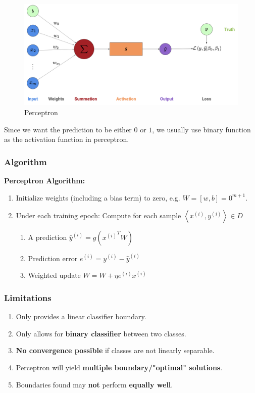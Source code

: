 \documentclass[11pt,a4paper]{article}
\begin{document}
\begin{center}\begin{figure}[htbp]
    \centering
    \includegraphics[scale=0.2]{per.png}
    \caption{Perceptron}
    \label{}
\end{figure}\end{center}

Since we want the prediction to be either $0$ or $1$, we usually use binary function as the activation function in perceptron.


\subsubsection{Algorithm}
\textbf{Perceptron Algorithm:}
\begin{enumerate}[$\bullet$]
    \item Initialize weights (including a bias term) to zero, e.g. $W=[w,b]=0^{m+1}$.
    \item Under each training epoch: Compute for each sample $\left\langle x^{(i)},y^{(i)}\right\rangle\in D$
    \begin{enumerate}[$\cdot$]
        \item A prediction $\hat{y}^{(i)}=g({x^{(i)}}^TW)$
        \item Prediction error $e^{(i)}=y^{(i)}-\hat{y}^{(i)}$
        \item Weighted update $W=W+\eta e^{(i)}x^{(i)}$
    \end{enumerate}
\end{enumerate}

\subsubsection{Limitations}
\begin{enumerate}[$(1)$]
    \item Only provides a linear classifier boundary.
    \item Only allows for \textbf{binary classifier} between two classes.
    \item \textbf{No convergence possible} if classes are not linearly
    separable.
    \item Perceptron will yield \textbf{multiple boundary/"optimal"
    solutions}.
    \item Boundaries found may \textbf{not} perform \textbf{equally well}.
\end{enumerate}
\end{document}
